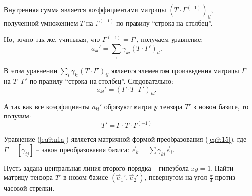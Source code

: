 	Внутренняя сумма является коэффициентами матрицы \(( T\cdot\Gamma^{(-1)} )_{il} \), полученной умножением \( T \) на \( \Gamma^{(-1)} \) по правилу ``строка-на-столбец''.

	Но, точно так же, учитывая, что \( \Gamma^{(-1)} = \Gamma' \), получаем уравнение:
	\[ a_{kl}' = \sum\limits_i \gamma_{ki} (T\cdot\Gamma')_{il}. \]
	
	В этом уравнении \( \sum\limits_i \gamma_{ki} (T\cdot\Gamma')_{il} \) является элементом произведения матрицы \( \Gamma \) на \( T\cdot\Gamma' \) по правилу ``строка-на-столбец''. Следовательно:
	\[ a_{kl}' = (\Gamma\cdot T\cdot\Gamma')_{kl}. \]
	
	А так как все коэффициенты \( a_{kl}' \) образуют матрицу тензора \( T' \) в новом базисе, то получим:
	\begin{equation}
		T' = \Gamma\cdot T\cdot\Gamma^{(-1)} \label{eq9:n1a}
	\end{equation}
	
	Уравнение (\ref{eq9:n1a}) является матричной формой преобразования (\ref{eq9:15}), где \( \Gamma = [\gamma_{ij}] \) -- закон преобразования базиса: \( \vec{e}_k = \sum \gamma_{ki}\vec{e}_i \).
	
	\begin{example}
	Пусть задана центральная линия второго порядка -- гипербола \( xy = 1 \). Найти матрицу тензора \( T' \) в новом базисе \( (\vec{e}_1{'}, \vec{e}_2{'}) \), повернутом на угол \( \frac{\pi}{4} \) против часовой стрелки. %
	\end{example}
	
